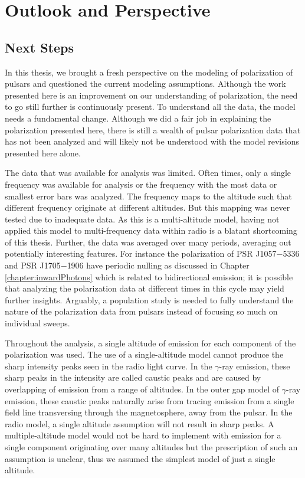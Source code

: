 \chapter{Outlook and Perspective}
\label{chapter:outlook}

\section{Next Steps}
\label{sec:future}

In this thesis, we brought a fresh perspective 
on the modeling of polarization of pulsars
and questioned the current modeling assumptions.
Although the work presented here 
is an improvement on our understanding
of polarization, the need to go still further
is continuously present.
To understand all the data, the model
needs a fundamental change.  Although we did a fair
job in explaining the polarization presented
here, there is still a wealth of pulsar
polarization data that has not been analyzed
and will likely not be understood with the
model revisions presented here alone.

The data that was available for analysis
was limited.  Often times, only a single frequency 
was available for analysis or the frequency with the
most data or smallest error bars was analyzed.
The frequency maps to the altitude \citep{cordes1978observational} 
such that different frequency originate at different
altitudes.
But this mapping    
was never tested due to inadequate data.
As this is a multi-altitude model, having not applied
this model to multi-frequency data within radio
is a blatant shortcoming of this thesis.
Further, the data was averaged over many periods,
averaging out potentially interesting features.  
For instance the polarization of PSR J1057$-$5336
and PSR J1705$-$1906 have periodic nulling as discussed 
in Chapter \ref{chapter:inwardPhotons} which is related to bidirectional
emission; it is possible that analyzing the polarization
data at different times in this cycle may 
yield further insights.
Arguably, a population study is needed
to fully understand the nature of the polarization
data from pulsars instead of focusing so much on
individual sweeps.

Throughout the analysis,
a single altitude of emission for each component
of the polarization was used. 
The use of a single-altitude model cannot produce the
sharp intensity peaks seen in the radio light curve.
In the $\gamma$-ray emission, these sharp peaks in the intensity 
are called caustic peaks and are caused by 
overlapping of emission from a range of altitudes.
In the outer gap model of $\gamma$-ray emission,
these caustic peaks naturally arise from tracing
emission from a single field line transversing through the 
magnetosphere, away from the pulsar.
In the radio model, a single altitude assumption will not 
result in sharp peaks.  A multiple-altitude model would not
be hard to implement with emission for a single component
originating over many altitudes but the prescription of
such an assumption is unclear, thus we assumed the simplest 
model of just a single altitude.

